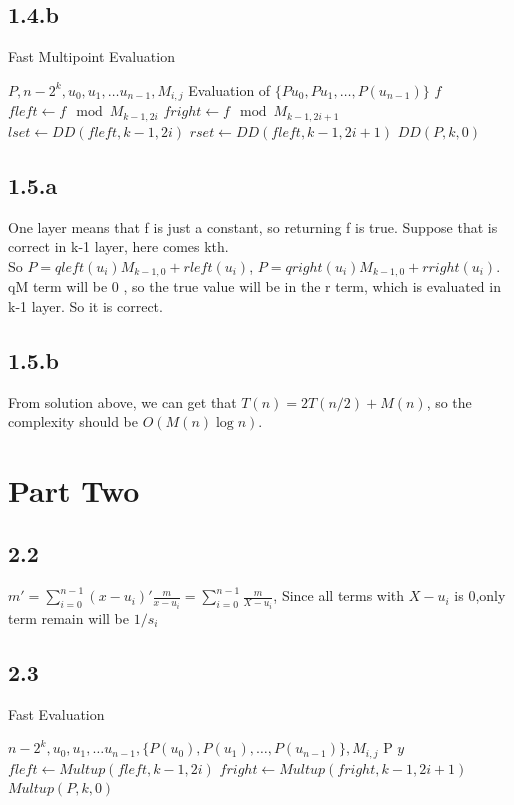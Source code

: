 \documentclass{article}
\begin{document}
\subsection*{1.4.b}
\begin{algorithm}
    \caption{Fast Multipoint Evaluation}
    \begin{algorithmic}[1]
    \Require $P, n- 2^k,{u_0, u_1, \dots u_{n-1}}, M_{i,j}$ 
    \Ensure Evaluation of $ \{{P{u_0}, P{u_1}, \dots, P(u_{n-1})}\}$
        \State \Return $f$  
        \EndIf
		\State $fleft\gets f\mod M_{k-1, 2i} $
        \State $fright\gets f\mod M_{k-1, 2i+1} $
		\State $lset\gets DD(fleft, k-1, 2i)$
        \State $rset\gets DD(fleft, k-1, 2i+1)$
		\State {}  %
		\EndFunction  
        \State \Return $DD(P, k, 0)$
    \end{algorithmic}
\end{algorithm}
\subsection*{1.5.a}
One layer means that f is just a constant, so returning f is true.
Suppose that is correct in k-1 layer, here comes kth.
\\So $P= qleft(u_i)M_{k-1, 0}+rleft(u_i)$, $P =qright(u_i)M_{k-1, 0}+rright(u_i)$.
qM term will be 0 , so the true value will be in the r term, which is evaluated in k-1 layer. So it is correct.
\subsection*{1.5.b}
From solution above, we can get that $T(n)= 2T(n/2)+M(n)$, so the complexity should be $O(M(n)\log{n})$.
\section{Part Two}
\subsection*{2.2}
$m' = \sum_{i = 0}^{n-1}(x-u_i)' \frac{m}{x-u_i}= \sum_{i=0}^{n-1}\frac{m}{X-u_i}$, Since all terms with $X-u_i$ is 0,only term remain will be $1/s_i$
\subsection*{2.3}
\begin{algorithm}
    \caption{Fast Evaluation}
    \begin{algorithmic}[1]
    \Require $ n- 2^k,{u_0, u_1, \dots u_{n-1}}, \{P(u_0), P(u_1), \dots , P(u_{n-1})\}, M_{i,j}$ 
    \Ensure P
        \State \Return $y$  
        \EndIf
		\State $fleft\gets Multup(fleft, k-1, 2i)$
        \State $fright\gets Multup(fright, k-1, 2i+1)$
		\State {}  %
		\EndFunction  
        \State \Return $Multup(P, k, 0)$
    \end{algorithmic}
\end{algorithm}
\end{document}
